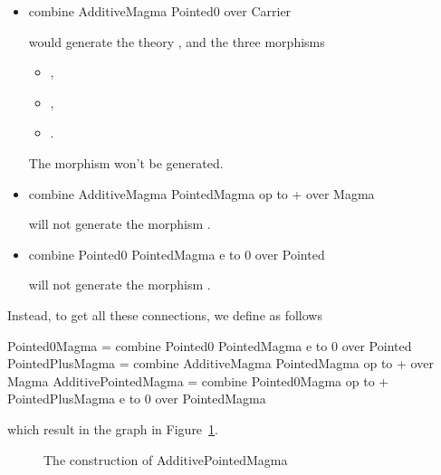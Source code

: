 \begin{itemize}
 \item  
\begin{togcode}
combine AdditiveMagma {} Pointed0 {} over Carrier
\end{togcode}
would generate the theory , and the three morphisms 
\begin{itemize}
    \item {}, 
    \item {}, 
    \item {}. 
\end{itemize}
The morphism  won't be generated. 

\item  
\begin{togcode}
combine AdditiveMagma {} PointedMagma {op to +} over Magma 
\end{togcode}
will not generate the morphism . 

\item 
\begin{togcode}
combine Pointed0 {} PointedMagma {e to 0} over Pointed 
\end{togcode}
will not generate the morphism . 
\end{itemize}
Instead, to get all these connections, we define  as follows 
\begin{togcode}
Pointed0Magma = 
  combine Pointed0 {} PointedMagma {e to 0} over Pointed
PointedPlusMagma = 
  combine AdditiveMagma {} PointedMagma {op to +} over Magma
AdditivePointedMagma = 
  combine Pointed0Magma {op to +} PointedPlusMagma {e to 0} 
  over PointedMagma
\end{togcode}
which result in the graph in Figure~\ref{fig:addPointedMagmaReal}.  
\begin{figure}[h]
    \caption{The construction of AdditivePointedMagma}
    \label{fig:addPointedMagmaReal}
\end{figure}
